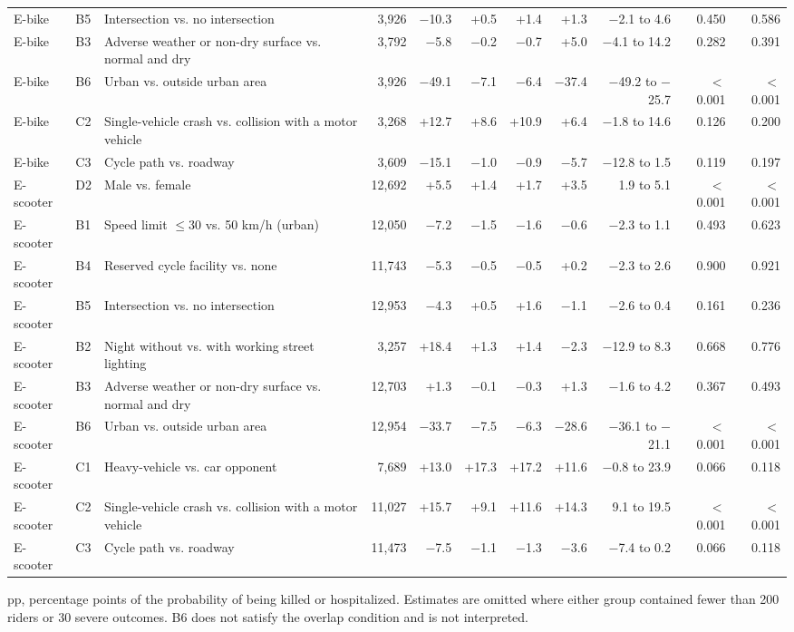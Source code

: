 \begin{table}[tp]
\begin{threeparttable}
{\begin{tabular}{llp{4.4cm}rrrrrrrr}
E-bike & B5 & Intersection vs. no intersection & 3,926 & $-$10.3 & +0.5 & +1.4 & +1.3 & $-$2.1 to 4.6 & 0.450 & 0.586 \\
E-bike & B3 & Adverse weather or non-dry surface vs. normal and dry & 3,792 & $-$5.8 & $-$0.2 & $-$0.7 & +5.0 & $-$4.1 to 14.2 & 0.282 & 0.391 \\
E-bike & B6 & Urban vs. outside urban area & 3,926 & $-$49.1 & $-$7.1 & $-$6.4 & $-$37.4 & $-$49.2 to $-$25.7 & $<$0.001 & $<$0.001 \\
E-bike & C2 & Single-vehicle crash vs. collision with a motor vehicle & 3,268 & +12.7 & +8.6 & +10.9 & +6.4 & $-$1.8 to 14.6 & 0.126 & 0.200 \\
E-bike & C3 & Cycle path vs. roadway & 3,609 & $-$15.1 & $-$1.0 & $-$0.9 & $-$5.7 & $-$12.8 to 1.5 & 0.119 & 0.197 \\
E-scooter & D2 & Male vs. female & 12,692 & +5.5 & +1.4 & +1.7 & +3.5 & 1.9 to 5.1 & $<$0.001 & $<$0.001 \\
E-scooter & B1 & Speed limit $\leq$30 vs. 50 km/h (urban) & 12,050 & $-$7.2 & $-$1.5 & $-$1.6 & $-$0.6 & $-$2.3 to 1.1 & 0.493 & 0.623 \\
E-scooter & B4 & Reserved cycle facility vs. none & 11,743 & $-$5.3 & $-$0.5 & $-$0.5 & +0.2 & $-$2.3 to 2.6 & 0.900 & 0.921 \\
E-scooter & B5 & Intersection vs. no intersection & 12,953 & $-$4.3 & +0.5 & +1.6 & $-$1.1 & $-$2.6 to 0.4 & 0.161 & 0.236 \\
E-scooter & B2 & Night without vs. with working street lighting & 3,257 & +18.4 & +1.3 & +1.4 & $-$2.3 & $-$12.9 to 8.3 & 0.668 & 0.776 \\
E-scooter & B3 & Adverse weather or non-dry surface vs. normal and dry & 12,703 & +1.3 & $-$0.1 & $-$0.3 & +1.3 & $-$1.6 to 4.2 & 0.367 & 0.493 \\
E-scooter & B6 & Urban vs. outside urban area & 12,954 & $-$33.7 & $-$7.5 & $-$6.3 & $-$28.6 & $-$36.1 to $-$21.1 & $<$0.001 & $<$0.001 \\
E-scooter & C1 & Heavy-vehicle vs. car opponent & 7,689 & +13.0 & +17.3 & +17.2 & +11.6 & $-$0.8 to 23.9 & 0.066 & 0.118 \\
E-scooter & C2 & Single-vehicle crash vs. collision with a motor vehicle & 11,027 & +15.7 & +9.1 & +11.6 & +14.3 & 9.1 to 19.5 & $<$0.001 & $<$0.001 \\
E-scooter & C3 & Cycle path vs. roadway & 11,473 & $-$7.5 & $-$1.1 & $-$1.3 & $-$3.6 & $-$7.4 to 0.2 & 0.066 & 0.118 \\
\bottomrule
\end{tabular}}
\begin{tablenotes}[flushleft]\footnotesize
\item pp, percentage points of the probability of being killed or hospitalized. Estimates are omitted where either group contained fewer than 200 riders or 30 severe outcomes. B6 does not satisfy the overlap condition and is not interpreted.
\end{tablenotes}
\end{threeparttable}
\end{table}
